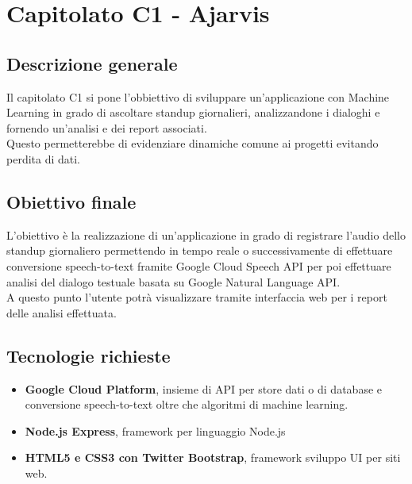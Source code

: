 \documentclass[StudioDiFattibilità.tex]{subfiles}
\begin{document}
\chapter{Capitolato C1 - Ajarvis}
\section{Descrizione generale}
Il capitolato C1 si pone l'obbiettivo di sviluppare un'applicazione con Machine Learning in grado di ascoltare standup giornalieri, analizzandone i dialoghi e fornendo un'analisi e dei report associati.\\
Questo permetterebbe di evidenziare dinamiche comune ai progetti evitando perdita di dati.

\section{Obiettivo finale}
L’obiettivo è la realizzazione di un'applicazione in grado di registrare l'audio dello standup giornaliero permettendo in tempo reale o successivamente di effettuare conversione speech-to-text framite Google Cloud Speech API per poi effettuare analisi del dialogo testuale basata su Google Natural Language API.\\
A questo punto l'utente potrà visualizzare tramite interfaccia web per i report delle analisi effettuata. 

\section{Tecnologie richieste}
\begin{itemize}
	\item \textbf{Google Cloud Platform}, insieme di API per store dati o di database e conversione speech-to-text oltre che algoritmi di machine learning.
	\item \textbf{ Node.js Express}, framework per linguaggio Node.js 
	\item \textbf{ HTML5 e CSS3 con Twitter Bootstrap}, framework sviluppo UI per siti web.
\end{itemize}
\end{document}
